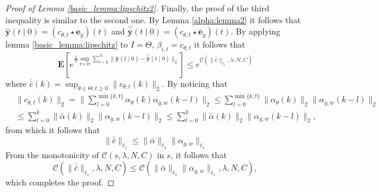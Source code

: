 \documentclass{article}
\def\rvy{{\mathbf{y}}}
\newcommand{\e}{\mathbf{e}}
\newcommand{\x}{\mathbf{x}}
\newcommand{\y}{\mathbf{y}}
\newcommand{\bE}{\mathbf{E}}
\begin{document}
\begin{proof}[Proof of Lemma \ref{basic_lemma:lipschitz2}]
 Finally, the proof of the third inequality is similar to the second one. 
 By Lemma \ref{alpha:lemma2} it follows that 
 $\hat{\y}(t\mid 0)=(c_{\theta,t} \star \e_g)(t)$ and 
 $\hat{\bar{\y}}(t\mid 0)=(c_{\theta,t} \star \bar{\e}_g)(t)$.
 By applying lemma \ref{basic_lemma:lipschitz} to 
 $I=\Theta$, $\beta_{i,t}=c_{\theta,t}$  it follows that 
 \[ \bE[e^{\frac{\lambda}{N} \sup_{\theta \in \Theta}\sum_{t=0}^{N} \|\hat{\y}(t \mid 0)-\hat{\bar{\y}}(t \mid 0)\|_2}] \le e^{\mathcal{C}(\|\bar{\bar{c}}\|_{\ell_1},\lambda,N,C)} 
  \]
  where $\bar{\bar{c}}(k)=\sup_{\theta \in \Theta, t \ge 0} \|c_{\theta,t}(k)\|_2$.
  By noticing that 
  \begin{align*}
     & \|c_{\theta,t}(k)\|_2=\|\sum_{l=0}^{\min\{k,t\}} \alpha_{\theta}(k)\alpha_{g,w}(k-l)\|_2 \le \sum_{l=0}^{\min\{k,t\}} \|\alpha_{\theta}(k)\|_2 \|\alpha_{g,w}(k-l)\|_2  \\
     & \le \sum_{l=0}^{k} \|\bar{\alpha}(k)\|_2 \|\alpha_{g,w}(k-l)\|_2
     \le \sum_{l=0}^{k} \|\bar{\alpha}(k)\|_2 \|\alpha_{g,w}(k-l)\|_2,
  \end{align*}
from which it follows that 
\[
\|\bar{\bar{c}}\|_{\ell_1} \le \|\bar{\alpha}\|_{\ell_1} \|\alpha_{g,w}\|_{\ell_1}
\]
From the monotonicity of $\mathcal{C}(s,\lambda,N,C)$ in $s$, it follows that
\[
\mathcal{C}(\|\bar{\bar{c}}\|_{\ell_1},\lambda,N,C) \le \mathcal{C}(\|\bar{\alpha}\|_{\ell_1} \|\alpha_{g,w}\|_{\ell_1},\lambda,N,C),
\]
which completes the proof.

\end{proof}
\end{document}
